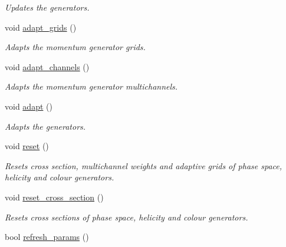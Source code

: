 \begin{DoxyCompactItemize}
\begin{DoxyCompactList}\small\item\em Updates the generators. \end{DoxyCompactList}\item 
\hypertarget{a00430_a4624c85bb2c5a4c720d3944944fff482}{void \hyperlink{a00430_a4624c85bb2c5a4c720d3944944fff482}{adapt\-\_\-grids} ()}\label{a00430_a4624c85bb2c5a4c720d3944944fff482}

\begin{DoxyCompactList}\small\item\em Adapts the momentum generator grids. \end{DoxyCompactList}\item 
\hypertarget{a00430_acb541bb6c5b63fae01ff147f4cd2823f}{void \hyperlink{a00430_acb541bb6c5b63fae01ff147f4cd2823f}{adapt\-\_\-channels} ()}\label{a00430_acb541bb6c5b63fae01ff147f4cd2823f}

\begin{DoxyCompactList}\small\item\em Adapts the momentum generator multichannels. \end{DoxyCompactList}\item 
\hypertarget{a00430_a7f97f414b5f3d689efb551aa4f6b1d1c}{void \hyperlink{a00430_a7f97f414b5f3d689efb551aa4f6b1d1c}{adapt} ()}\label{a00430_a7f97f414b5f3d689efb551aa4f6b1d1c}

\begin{DoxyCompactList}\small\item\em Adapts the generators. \end{DoxyCompactList}\item 
void \hyperlink{a00430_aa2cd6b9887022d49cd48497b8061c54d}{reset} ()
\begin{DoxyCompactList}\small\item\em Resets cross section, multichannel weights and adaptive grids of phase space, helicity and colour generators. \end{DoxyCompactList}\item 
\hypertarget{a00430_a7291d00338eceaefb5b5608625b2bec6}{void \hyperlink{a00430_a7291d00338eceaefb5b5608625b2bec6}{reset\-\_\-cross\-\_\-section} ()}\label{a00430_a7291d00338eceaefb5b5608625b2bec6}

\begin{DoxyCompactList}\small\item\em Resets cross sections of phase space, helicity and colour generators. \end{DoxyCompactList}\item 
\hypertarget{a00430_a097bfddf2a2231b766b93649075372b3}{bool \hyperlink{a00430_a097bfddf2a2231b766b93649075372b3}{refresh\-\_\-params} ()}\label{a00430_a097bfddf2a2231b766b93649075372b3}


\end{DoxyCompactItemize}
